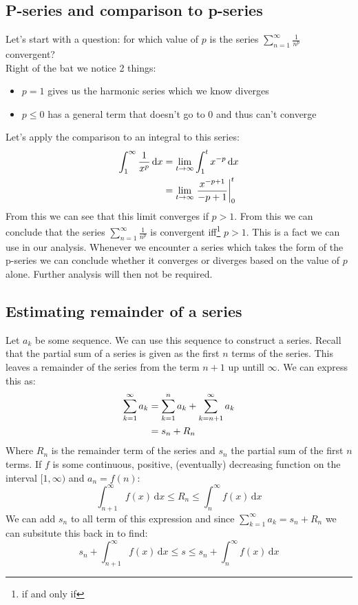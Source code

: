 \documentclass[11pt, a4paper]{article}
\renewcommand*{\d}{\text{d}}
\numberwithin{equation}{section}
\numberwithin{figure}{section}
\begin{document}
\subsection{P-series and comparison to p-series}
Let's start with a question: for which value of $p$ is the series $\sum_{n=1}^\infty \frac{1}{n^p}$ convergent?\\
Right of the bat we notice 2 things:
\begin{itemize}
  \item $p=1$ gives us the harmonic series which we know diverges
  \item $p \leq 0$ has a general term that doesn't go to $0$ and thus can't converge
\end{itemize}
Let's apply the comparison to an integral to this series:
\begin{align}
  \int_1^\infty \frac{1}{x^p}\,\d x &= \lim_{t\to\infty}\int_1^t x^{-p}\,\d x \notag\\
                                    &= \lim_{t\to\infty} \left. \frac{x^{-p+1}}{-p+1} \right|_0^t
\end{align}
From this we can see that this limit converges if $p>1$. From this we can conclude that the series $\sum_{n=1}^\infty \frac{1}{n^p}$ is convergent iff\footnote{if and only if} $p>1$. This is a fact we can use in our analysis. Whenever we encounter a series which takes the form of the p-series we can conclude whether it converges or diverges based on the value of $p$ alone. Further analysis will then not be required.


\subsection{Estimating remainder of a series}
Let $a_k$ be some sequence. We can use this sequence to construct a series. Recall that the partial sum of a series is given as the first $n$ terms of the series. This leaves a remainder of the series from the term $n+1$ up untill $\infty$. We can express this as:
\begin{align}
  \sum_{k=1}^\infty a_k &= \sum_{k=1}^n a_k + \sum_{k=n+1}^\infty a_k \notag\\
                        &= s_n + R_n
\end{align}
Where $R_n$ is the remainder term of the series and $s_n$ the partial sum of the first $n$ terms. If $f$ is some continuous, positive, (eventually) decreasing function on the interval $[1, \infty)$ and $a_n = f(n)$:
\begin{equation}
  \int_{n+1}^\infty f(x)\,\d x \leq R_n \leq \int_{n}^\infty f(x)\,\d x
\end{equation}
We can add $s_n$ to all term of this expression and since $\sum_{k=1}^\infty a_k = s_n + R_n$ we can subsitute this back in to find:
\begin{equation}
  s_n + \int_{n+1}^\infty f(x)\,\d x \leq s \leq s_n +  \int_{n}^\infty f(x)\,\d x
\end{equation}
\end{document}
